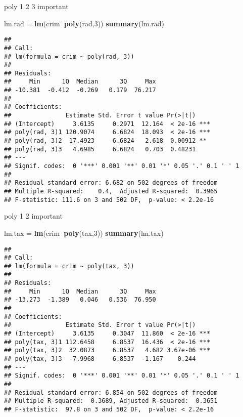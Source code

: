 \documentclass[]{article}
\newenvironment{Shaded}{\begin{snugshade}}{\end{snugshade}}
\newcommand{\DecValTok}[1]{\textcolor[rgb]{0.00,0.00,0.81}{#1}}
\newcommand{\KeywordTok}[1]{\textcolor[rgb]{0.13,0.29,0.53}{\textbf{#1}}}
\newcommand{\NormalTok}[1]{#1}
\newcommand{\OperatorTok}[1]{\textcolor[rgb]{0.81,0.36,0.00}{\textbf{#1}}}
\newcommand{\StringTok}[1]{\textcolor[rgb]{0.31,0.60,0.02}{#1}}
\begin{document}
poly 1 2 3 important

\begin{Shaded}
\begin{Highlighting}[]
\NormalTok{lm.rad =}\StringTok{ }\KeywordTok{lm}\NormalTok{(crim}\OperatorTok{~}\KeywordTok{poly}\NormalTok{(rad,}\DecValTok{3}\NormalTok{))}
\KeywordTok{summary}\NormalTok{(lm.rad) }
\end{Highlighting}
\end{Shaded}

\begin{verbatim}
## 
## Call:
## lm(formula = crim ~ poly(rad, 3))
## 
## Residuals:
##     Min      1Q  Median      3Q     Max 
## -10.381  -0.412  -0.269   0.179  76.217 
## 
## Coefficients:
##               Estimate Std. Error t value Pr(>|t|)    
## (Intercept)     3.6135     0.2971  12.164  < 2e-16 ***
## poly(rad, 3)1 120.9074     6.6824  18.093  < 2e-16 ***
## poly(rad, 3)2  17.4923     6.6824   2.618  0.00912 ** 
## poly(rad, 3)3   4.6985     6.6824   0.703  0.48231    
## ---
## Signif. codes:  0 '***' 0.001 '**' 0.01 '*' 0.05 '.' 0.1 ' ' 1
## 
## Residual standard error: 6.682 on 502 degrees of freedom
## Multiple R-squared:    0.4,  Adjusted R-squared:  0.3965 
## F-statistic: 111.6 on 3 and 502 DF,  p-value: < 2.2e-16
\end{verbatim}

poly 1 2 important

\begin{Shaded}
\begin{Highlighting}[]
\NormalTok{lm.tax =}\StringTok{ }\KeywordTok{lm}\NormalTok{(crim}\OperatorTok{~}\KeywordTok{poly}\NormalTok{(tax,}\DecValTok{3}\NormalTok{))}
\KeywordTok{summary}\NormalTok{(lm.tax)}
\end{Highlighting}
\end{Shaded}

\begin{verbatim}
## 
## Call:
## lm(formula = crim ~ poly(tax, 3))
## 
## Residuals:
##     Min      1Q  Median      3Q     Max 
## -13.273  -1.389   0.046   0.536  76.950 
## 
## Coefficients:
##               Estimate Std. Error t value Pr(>|t|)    
## (Intercept)     3.6135     0.3047  11.860  < 2e-16 ***
## poly(tax, 3)1 112.6458     6.8537  16.436  < 2e-16 ***
## poly(tax, 3)2  32.0873     6.8537   4.682 3.67e-06 ***
## poly(tax, 3)3  -7.9968     6.8537  -1.167    0.244    
## ---
## Signif. codes:  0 '***' 0.001 '**' 0.01 '*' 0.05 '.' 0.1 ' ' 1
## 
## Residual standard error: 6.854 on 502 degrees of freedom
## Multiple R-squared:  0.3689, Adjusted R-squared:  0.3651 
## F-statistic:  97.8 on 3 and 502 DF,  p-value: < 2.2e-16
\end{verbatim}
\end{document}
